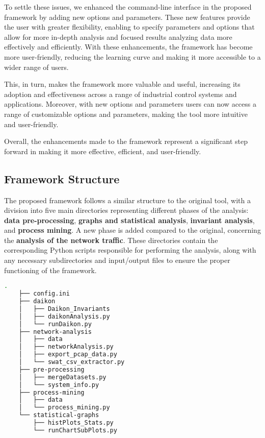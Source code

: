 \begin{description}
	\bigskip
	To settle these issues, we enhanced the command-line interface in the proposed framework by adding new options and parameters. These new features provide the user with greater flexibility, enabling to specify parameters and options that allow for more in-depth analysis and focused results analyzing data more effectively and efficiently. With these enhancements, the framework has become more user-friendly, reducing the learning curve and making it more accessible to a wider range of users. 
	
	This, in turn, makes the framework more valuable and useful, increasing its adoption and effectiveness across a range of industrial control systems and applications. \newline
	Moreover, with new options and parameters users can now access a range of customizable options and parameters, making the tool more intuitive and user-friendly. 
\end{description}

Overall, the enhancements made to the framework represent a significant step forward in making it more effective, efficient, and user-friendly.

\vfill

\subsection{Framework Structure}
\label{subsec:4_framework_struct}
The proposed framework follows a similar structure to the original tool, with a division into five main directories representing different phases of the analysis: \textbf{data pre-processing}, \textbf{graphs and statistical analysis}, \textbf{invariant analysis}, and \textbf{process mining}. A new phase is added compared to the original, concerning the \textbf{analysis of the network traffic}. These directories contain the corresponding Python scripts responsible for performing the analysis, along with any necessary subdirectories and input/output files to ensure the proper functioning of the framework.

\begin{lstlisting}[language=bash, numbers=none, caption=Novel Framework structure and Python scripts, label=lst:4_tree_command]
	.
	├── config.ini
	├── daikon
	│   ├── Daikon_Invariants
	│   ├── daikonAnalysis.py
	│   └── runDaikon.py
	├── network-analysis
	│   ├── data
	│   ├── networkAnalysis.py
	│   ├── export_pcap_data.py
	│   └── swat_csv_extractor.py
	├── pre-processing
	│   ├── mergeDatasets.py
	│   └── system_info.py
	├── process-mining
	│   ├── data
	│   └── process_mining.py
	└── statistical-graphs
	    ├── histPlots_Stats.py
	    └── runChartSubPlots.py
\end{lstlisting}

